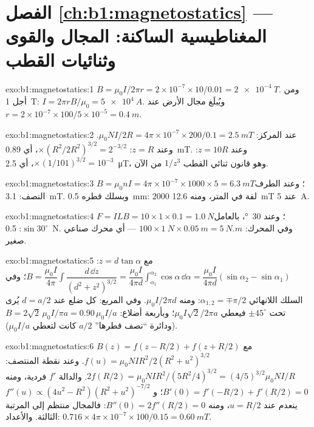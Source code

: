 \section*{الفصل \ref{ch:b1:magnetostatics} --- المغناطيسية الساكنة: المجال والقوى وثنائيات القطب}

\begin{solution}{exo:b1:magnetostatics:1}
$B = \mu_0I/2\pi r = 2 \times 10^{-7} \times 10/0.01 = \qty{2e-4}{T}$. ومن أجل \qty{1}{T}:
$I = 2\pi rB/\mu_0 = \qty{5e4}{A}$. ويُبلَغ مجال الأرض عند $r = 2 \times 10^{-7} \times
100/5 \times 10^{-5} = \qty{0.4}{m}$.
\end{solution}

\begin{solution}{exo:b1:magnetostatics:2}
عند المركز: $\mu_0NI/2R = 4\pi \times 10^{-7} \times 200/0.1 = \qty{2.5}{mT}$. وعند $z = R$:
$\times(R^2/2R^2)^{3/2} = 2^{-3/2}$، أي \qty{0.89}{mT}. وعند $z = 10R$: $\times(1/101)^{3/2}
= 10^{-3}$، أي \qty{2.5}{\micro T}، وهو قانون ثنائي القطب $1/z^3$ من الآن.
\end{solution}

\begin{solution}{exo:b1:magnetostatics:3}
$B = \mu_0nI = 4\pi \times 10^{-7} \times 1000 \times 5 = \qty{6.3}{mT}$؛ وعند الطرف
النصف: \qty{3.1}{mT}. وبسلك قطره \qty{0.5}{mm}: $2000$ لفة في المتر، ومنه
\qty{12.6}{mT} عند \qty{5}{A}.
\end{solution}

\begin{solution}{exo:b1:magnetostatics:4}
$F = ILB = 10 \times 1 \times 0.1 = \qty{1.0}{N}$؛ وعند \qty{30}{\degree}، بالعامل $\sin30^\circ$:
\qty{0.5}{N}. وفي المحرك: $100 \times \qty{1}{N} \times \qty{0.05}{m} = \qty{5}{N.m}$ ---
أي محرك صناعي صغير.
\end{solution}

\begin{solution}{exo:b1:magnetostatics:5}
مع $z = d\tan\alpha$: $B = \dfrac{\mu_0I}{4\pi}\displaystyle\int\dfrac{d\,\dd z}{(d^2 + z^2)^{3/2}}
= \dfrac{\mu_0I}{4\pi d}\displaystyle\int_{\alpha_1}^{\alpha_2}\cos\alpha\,\dd\alpha = \dfrac{\mu_0I}{4\pi d}
(\sin\alpha_2 - \sin\alpha_1)$؛ وفي السلك اللانهائي $\alpha_{1,2} = \mp\pi/2$: ومنه $\mu_0I/2\pi d$.
وفي المربع: كل ضلع عند $d = a/2$ يُرى تحت $\pm45^\circ$ فيعطي $\mu_0I\sqrt2/2\pi a$؛
وبأربعة أضلاع: $B = 2\sqrt2\,\mu_0I/\pi a = 0.90\,\mu_0I/a$ (ودائرة ``نصف قطرها''
$a/2$ كانت لتعطي $\mu_0I/a$).
\end{solution}

\begin{solution}{exo:b1:magnetostatics:6}
$B(z) = f(z - R/2) + f(z + R/2)$ مع $f(u) = \mu_0NIR^2/2(R^2 + u^2)^{3/2}$.
وعند نقطة المنتصف: $2f(R/2) = \mu_0NIR^2/(5R^2/4)^{3/2} = (4/5)^{3/2}\mu_0NI/R$. والدالة $f'$
فردية، ومنه $B'(0) = f'(-R/2) + f'(R/2) = 0$؛ و $f''(u) \propto (4u^2 - R^2)(R^2 +
u^2)^{-7/2}$ ينعدم عند $u = R/2$، ومنه $B''(0) = 2f''(R/2) = 0$: فالمجال
منتظم إلى المرتبة الثالثة. والأعداد: $0.716 \times 4\pi \times 10^{-7} \times 100/0.15 =
\qty{0.60}{mT}$.
\end{solution}

